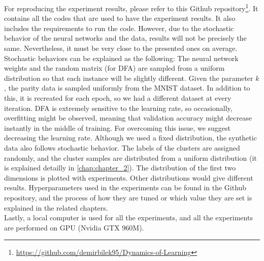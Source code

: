 \documentclass[a4paper, nobind]{templates/ociamthesis}
\newcommand*{\bibtitle}{References}
\begin{document}
For reproducing the experiment results, please refer to this Github repository\footnote{\url{https://github.com/demirbilek95/Dynamics-of-Learning}}. It contains all the codes that are used to have the experiment results. It also includes the requirements to run the code. However, due to the stochastic behavior of the neural networks and the data, results will not be precisely the same. Nevertheless, it must be very close to the presented ones on average. Stochastic behaviors can be explained as the following: The neural network weights and the random matrix (for DFA) are sampled from a uniform distribution so that each instance will be slightly different. Given the parameter \(k\), the parity data is sampled uniformly from the MNIST dataset. In addition to this, it is recreated for each epoch, so we had a different dataset at every iteration. DFA is extremely sensitive to the learning rate, so occasionally, overfitting might be observed, meaning that validation accuracy might decrease instantly in the middle of training. For overcoming this issue, we suggest decreasing the learning rate. Although we used a fixed distribution, the synthetic data also follows stochastic behavior. The labels of the clusters are assigned randomly, and the cluster samples are distributed from a uniform distribution (it is explained detailly in \ref{chap:chapter_2}). The distribution of the first two dimensions is plotted with experiments. Other distributions would give different results. Hyperparameters used in the experiments can be found in the Github repository, and the process of how they are tuned or which value they are set is explained in the related chapters.\\
Lastly, a local computer is used for all the experiments, and all the experiments are performed on GPU (Nvidia GTX 960M).


\setlength{\baselineskip}{0pt} %

{\renewcommand*\MakeUppercase[1]{#1}%
\printbibliography[heading=bibintoc,title={\bibtitle}]}
\end{document}
